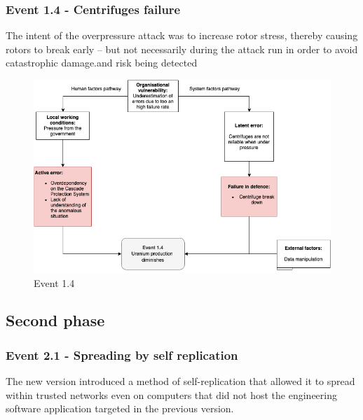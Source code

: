\documentclass[12pt]{article}
\begin{document}
      \subsubsection{Event 1.4 - Centrifuges failure}
      The intent of the overpressure attack was to increase rotor stress, thereby causing rotors to break early – but not necessarily during the attack run in order to avoid catastrophic damage.and risk being detected
        \begin{figure}[H]
        \centering
        \includegraphics[width=\textwidth]{event14.png}
        \caption{Event 1.4}
        \label{fig:event14}
        \end{figure}
        
    \subsection{Second phase}
    \subsubsection{Event 2.1 - Spreading by self replication}
    The new version introduced a method of self-replication that allowed it to spread within trusted networks even on computers that did not host the engineering software application targeted in the previous version.
    
\end{document}
